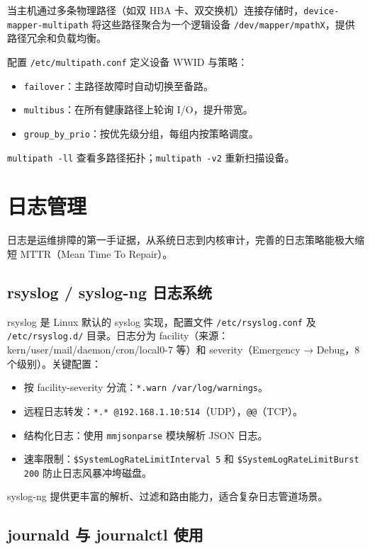 \documentclass[12pt,UTF8]{ctexbook}
\begin{document}
当主机通过多条物理路径（如双 HBA 卡、双交换机）连接存储时，\verb|device-mapper-multipath| 将这些路径聚合为一个逻辑设备 \verb|/dev/mapper/mpathX|，提供路径冗余和负载均衡。

配置 \verb|/etc/multipath.conf| 定义设备 WWID 与策略：
\begin{itemize}
	\item \verb|failover|：主路径故障时自动切换至备路。
	\item \verb|multibus|：在所有健康路径上轮询 I/O，提升带宽。
	\item \verb|group_by_prio|：按优先级分组，每组内按策略调度。
\end{itemize}

\verb|multipath -ll| 查看多路径拓扑；\verb|multipath -v2| 重新扫描设备。

  \section{日志管理}

日志是运维排障的第一手证据，从系统日志到内核审计，完善的日志策略能极大缩短 MTTR（Mean Time To Repair）。

    \subsection{rsyslog / syslog-ng 日志系统}

rsyslog 是 Linux 默认的 syslog 实现，配置文件 \verb|/etc/rsyslog.conf| 及 \verb|/etc/rsyslog.d/| 目录。日志分为 facility（来源：kern/user/mail/daemon/cron/local0-7 等）和 severity（Emergency → Debug，8 个级别）。关键配置：

\begin{itemize}
	\item 按 facility-severity 分流：\verb|*.warn /var/log/warnings|。
	\item 远程日志转发：\verb|*.* @192.168.1.10:514|（UDP），\verb|@@|（TCP）。
	\item 结构化日志：使用 \verb|mmjsonparse| 模块解析 JSON 日志。
	\item 速率限制：\verb|$SystemLogRateLimitInterval 5| 和 \verb|$SystemLogRateLimitBurst 200| 防止日志风暴冲垮磁盘。
\end{itemize}

syslog-ng 提供更丰富的解析、过滤和路由能力，适合复杂日志管道场景。

    \subsection{journald 与 journalctl 使用}
\end{document}
